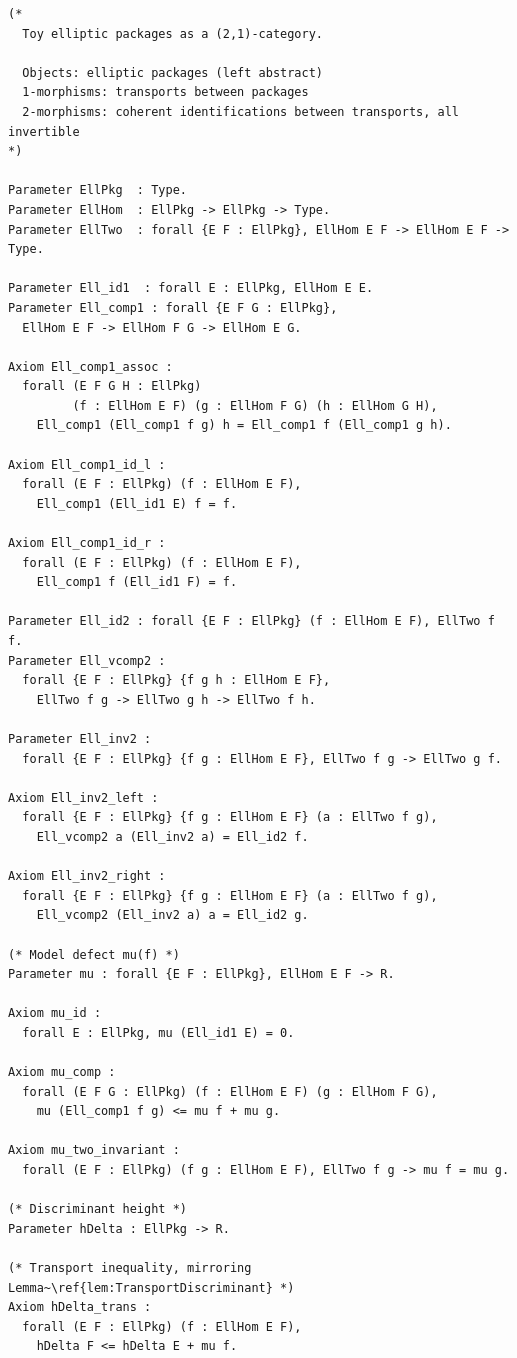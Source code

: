 \documentclass[10pt, reqno]{amsart}
\theoremstyle{plain}
\theoremstyle{definition}
\theoremstyle{plain}
\begin{document}
\begin{scriptsize}
\begin{verbatim}
(*
  Toy elliptic packages as a (2,1)-category.

  Objects: elliptic packages (left abstract)
  1-morphisms: transports between packages
  2-morphisms: coherent identifications between transports, all invertible
*)

Parameter EllPkg  : Type.
Parameter EllHom  : EllPkg -> EllPkg -> Type.
Parameter EllTwo  : forall {E F : EllPkg}, EllHom E F -> EllHom E F -> Type.

Parameter Ell_id1  : forall E : EllPkg, EllHom E E.
Parameter Ell_comp1 : forall {E F G : EllPkg},
  EllHom E F -> EllHom F G -> EllHom E G.

Axiom Ell_comp1_assoc :
  forall (E F G H : EllPkg)
         (f : EllHom E F) (g : EllHom F G) (h : EllHom G H),
    Ell_comp1 (Ell_comp1 f g) h = Ell_comp1 f (Ell_comp1 g h).

Axiom Ell_comp1_id_l :
  forall (E F : EllPkg) (f : EllHom E F),
    Ell_comp1 (Ell_id1 E) f = f.

Axiom Ell_comp1_id_r :
  forall (E F : EllPkg) (f : EllHom E F),
    Ell_comp1 f (Ell_id1 F) = f.

Parameter Ell_id2 : forall {E F : EllPkg} (f : EllHom E F), EllTwo f f.
Parameter Ell_vcomp2 :
  forall {E F : EllPkg} {f g h : EllHom E F},
    EllTwo f g -> EllTwo g h -> EllTwo f h.

Parameter Ell_inv2 :
  forall {E F : EllPkg} {f g : EllHom E F}, EllTwo f g -> EllTwo g f.

Axiom Ell_inv2_left :
  forall {E F : EllPkg} {f g : EllHom E F} (a : EllTwo f g),
    Ell_vcomp2 a (Ell_inv2 a) = Ell_id2 f.

Axiom Ell_inv2_right :
  forall {E F : EllPkg} {f g : EllHom E F} (a : EllTwo f g),
    Ell_vcomp2 (Ell_inv2 a) a = Ell_id2 g.

(* Model defect mu(f) *)
Parameter mu : forall {E F : EllPkg}, EllHom E F -> R.

Axiom mu_id :
  forall E : EllPkg, mu (Ell_id1 E) = 0.

Axiom mu_comp :
  forall (E F G : EllPkg) (f : EllHom E F) (g : EllHom F G),
    mu (Ell_comp1 f g) <= mu f + mu g.

Axiom mu_two_invariant :
  forall (E F : EllPkg) (f g : EllHom E F), EllTwo f g -> mu f = mu g.

(* Discriminant height *)
Parameter hDelta : EllPkg -> R.

(* Transport inequality, mirroring Lemma~\ref{lem:TransportDiscriminant} *)
Axiom hDelta_trans :
  forall (E F : EllPkg) (f : EllHom E F),
    hDelta F <= hDelta E + mu f.
\end{verbatim}
\end{scriptsize}
\end{document}
